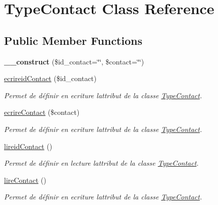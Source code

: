 \hypertarget{class_type_contact}{}\section{Type\+Contact Class Reference}
\label{class_type_contact}
\subsection*{Public Member Functions}
\begin{DoxyCompactItemize}
\item 
\mbox{\label{class_type_contact_ae6adc1b75e0ec6573fb73c481f550b3b}} 
{\bfseries \+\_\+\+\_\+construct} (\$id\+\_\+contact=\char`\"{}\char`\"{}, \$contact=\char`\"{}\char`\"{})
\item 
\hyperlink{class_type_contact_acdd6e6bff6fc01769d970ca7bc33be1f}{ecrireid\+Contact} (\$id\+\_\+contact)
\begin{DoxyCompactList}\small\item\em Permet de définir en ecriture l\textquotesingle{}attribut de la classe \hyperlink{class_type_contact}{Type\+Contact}. \end{DoxyCompactList}\item 
\hyperlink{class_type_contact_ae88b186082363707fcb738cc9ba39dbf}{ecrire\+Contact} (\$contact)
\begin{DoxyCompactList}\small\item\em Permet de définir en ecriture l\textquotesingle{}attribut de la classe \hyperlink{class_type_contact}{Type\+Contact}. \end{DoxyCompactList}\item 
\hyperlink{class_type_contact_a71484de1b3f2c85dfcc0454b422f95f6}{lireid\+Contact} ()
\begin{DoxyCompactList}\small\item\em Permet de définir en lecture l\textquotesingle{}attribut de la classe \hyperlink{class_type_contact}{Type\+Contact}. \end{DoxyCompactList}\item 
\hyperlink{class_type_contact_ac6cbf65706bad90e42fc9d18298f30c1}{lire\+Contact} ()
\begin{DoxyCompactList}\small\item\em Permet de définir en ecriture l\textquotesingle{}attribut de la classe \hyperlink{class_type_contact}{Type\+Contact}. \end{DoxyCompactList}\end{DoxyCompactItemize}


